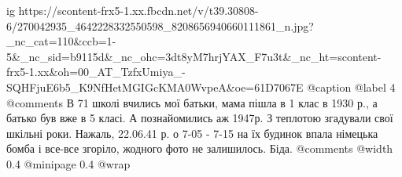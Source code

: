  
 
 
 
 

\ifcmt
  ig https://scontent-frx5-1.xx.fbcdn.net/v/t39.30808-6/270042935_4642228332550598_8208656940660111861_n.jpg?_nc_cat=110&ccb=1-5&_nc_sid=b9115d&_nc_ohc=3dt8yM7hrjYAX_F7u3t&_nc_ht=scontent-frx5-1.xx&oh=00_AT_TzfxUmiya_-SQHFjuE6b5_K9NfHetMGIGcKMA0WvpeA&oe=61D7067E
	@caption @label 4
	@comments%
    В 71 школі вчились мої батьки, мама пішла в 1 клас в 1930 р., а батько був вже
    в 5 класі. А познайомились аж 1947р. З теплотою згадували свої шкільні роки.
    Нажаль, 22.06.41 р. о 7-05 - 7-15 на їх будинок впала німецька бомба і все-все
    згоріло, жодного фото не залишилось. Біда.
	@comments%
  @width 0.4
  @minipage 0.4
  @wrap \parpic[r]
\fi
